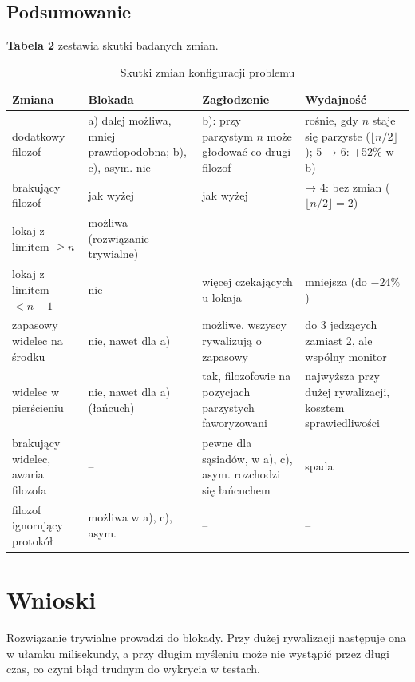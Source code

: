 \documentclass[11pt,a4paper]{article}
\begin{document}
\subsection{Podsumowanie}
\textbf{Tabela 2} zestawia skutki badanych zmian.

\begin{table}[H]
    \centering
    \renewcommand{\arraystretch}{1.3}
    \small
    \begin{tabular}{|>{\raggedright\arraybackslash}p{37mm}|>{\raggedright\arraybackslash}p{38mm}|>{\raggedright\arraybackslash}p{38mm}|>{\raggedright\arraybackslash}p{50mm}|}
        \hline
        \textbf{Zmiana} & \textbf{Blokada} & \textbf{Zagłodzenie} & \textbf{Wydajność} \\ \hline
        dodatkowy filozof & a) dalej możliwa, mniej prawdopodobna; b), c), asym. nie & b): przy parzystym $n$ może głodować co drugi filozof & rośnie, gdy $n$ staje się parzyste ($\lfloor n/2 \rfloor$); 5 → 6: +52\% w b) \\ \hline
        brakujący filozof & jak wyżej & jak wyżej & 5 → 4: bez zmian ($\lfloor n/2 \rfloor = 2$) \\ \hline
        lokaj z limitem $\ge n$ & możliwa (rozwiązanie trywialne) & -- & -- \\ \hline
        lokaj z limitem $< n - 1$ & nie & więcej czekających u lokaja & mniejsza (do $-24\%$) \\ \hline
        zapasowy widelec na środku & nie, nawet dla a) & możliwe, wszyscy rywalizują o zapasowy & do 3 jedzących zamiast 2, ale wspólny monitor \\ \hline
        widelec w pierścieniu & nie, nawet dla a) (łańcuch) & tak, filozofowie na pozycjach parzystych faworyzowani & najwyższa przy dużej rywalizacji, kosztem sprawiedliwości \\ \hline
        brakujący widelec, awaria filozofa & -- & pewne dla sąsiadów, w a), c), asym. rozchodzi się łańcuchem & spada \\ \hline
        filozof ignorujący protokół & możliwa w a), c), asym. & -- & -- \\ \hline
    \end{tabular}
    \caption{Skutki zmian konfiguracji problemu}
\end{table}

\section{Wnioski}
Rozwiązanie trywialne prowadzi do blokady. Przy dużej rywalizacji następuje ona w ułamku
milisekundy, a przy długim myśleniu może nie wystąpić przez długi czas, co czyni błąd trudnym
do wykrycia w testach.
\end{document}
